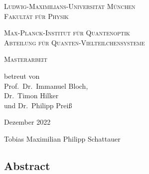 \begin{titlepage}
    \vspace*{\fill}
    \centering

    \textsc{\Large Ludwig-Maximilians-Universität München}\\
    \textsc{Fakultät für Physik}

    \vspace{1cm}

    \textsc{\Large Max-Planck-Institut für Quantenoptik}\\
    \textsc{Abteilung für Quanten-Vielteilchensysteme}

    \vspace{2.1cm}

    \begin{minipage}{0.91\textwidth}
        \centering
        \begin{doublespace}
            \textsc{ \Huge \titleDE}
        \end{doublespace}
    \end{minipage}


    \vspace{2.1cm}
    \huge \textsc{Masterarbeit}



    \vspace{0.3cm}
    \large \textrm{betreut von\\Prof.~Dr.~Immanuel Bloch,\\Dr.~Timon Hilker\\und Dr.~Philipp Preiß}

    \vspace{1.5cm}
    \huge
    \textrm{Dezember 2022}

    \vspace{1.5cm}
    \Large \textrm{Tobias Maximilian Philipp Schattauer}

    \vspace*{\fill}
\end{titlepage}

\begin{titlepage}
    \null\vspace{3cm}
    \centering
    \begin{minipage}{0.8\textwidth}
        \section*{Abstract}
        
    \end{minipage}
\end{titlepage}



\tableofcontents
\newpage